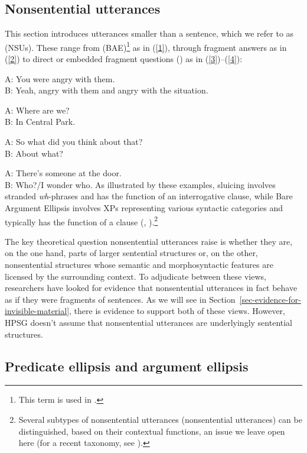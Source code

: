 \subsection{Nonsentential utterances}

This section introduces utterances smaller than a sentence, which we refer to as \emph{} (NSUs). These range from \emph{} (BAE)\footnote{This term is used in \citet[6]{CJ2005a}.} as in (\ref{1}), through fragment answers as in (\ref{2})
to direct or embedded fragment questions () as in (\ref{3})--(\ref{4}):

\ea A: You were angry with them.\\ B: Yeah, angry with them and angry with the situation.\label{1}\z

\ea A: Where are we? \\B: In Central Park.\label{2}\z

\ea A: So what did you think about that?\\ B: About what? \label{3}\z

\ea A: There's someone at the door. \\B: Who?/I wonder who. \label{4}\z
%
As illustrated by these examples, sluicing involves stranded \emph{wh}-phrases and has the function of an interrogative clause, while Bare Argument Ellipsis involves XPs representing various syntactic categories and typically has the function of a clause (\citealt[313]{Ginzburg:Sag:2000}, \citealt[233]{CJ2005a}).\footnote{Several subtypes of nonsentential utterances (nonsentential utterances) can be distinguished, based on their contextual functions, an issue we leave open here (for a recent taxonomy, see \citealt[217]{Ginzburg2012}).}

The key theoretical question nonsentential utterances raise is whether they are, on the one hand, parts of larger sentential structures or, on the other, nonsentential structures whose semantic and morphosyntactic features are licensed by the surrounding context. To adjudicate between these views, researchers have looked for evidence that nonsentential utterances in fact behave as if they were fragments of sentences. As we will see in Section~\ref{sec-evidence-for-invisible-material}, there is evidence to support both of these views. However, HPSG doesn't assume that nonsentential utterances are underlyingly sentential structures.

\subsection{Predicate ellipsis and argument ellipsis}
\label{ellipsis-sec-Predicate-ellipsis-and-argument-ellipsis}


